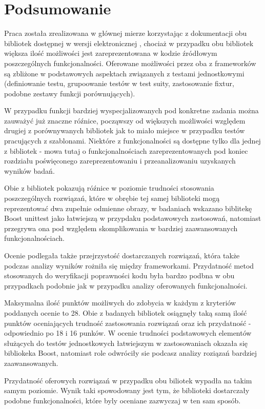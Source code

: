 \documentclass[12pt,a4paper,notitlepage]{report}
\begin{document}
\chapter{Podsumowanie}
	Praca została zrealizowana w głównej mierze korzystając z dokumentacji obu bibliotek dostępnej w wersji elektronicznej \cite{Primer}\cite{Advanced}\cite{Boost}, chociaż w przypadku obu bibliotek większa ilość możliwości jest zareprezentowana w kodzie źródłowym poszczególnych funkcjonalności. Oferowane możliwości przez oba z frameworków są zbliżone w podstawowych aspektach związanych z testami jednostkowymi (definiowanie testu, grupoowanie testów w test suity, zastosowanie fixtur, podobne zestawy funkcji porównujących).

	W przypadku funkcji bardziej wyspecjalizowanych pod konkretne zadania można zauważyć już znaczne róźnice, począwszy od większych możliwości względem drugiej z porównywanych bibliotek jak to miało miejsce w przypadku testów pracujących z szablonami. Niektóre z funkcjonalności są dostępne tylko dla jednej z bibliotek - mowa tutaj o funkcjonalnościach zareprezentowanych pod koniec rozdziału poświęconego zareprezentowaniu i przeanalizowaniu uzyskanych wyników badań.

	Obie z bibliotek pokazują róźnice w poziomie trudności stosowania poszczególnych rozwiązań, które w obrębie tej samej biblioteki mogą reprezentować dwa zupełnie odmienne obrazy, w badaniach wskazano biblitekę Boost unittest jako łatwiejszą w przypdaku podstawowych zastosowań, natomiast przegrywa ona pod względem skomplikowania w bardziej zaawansowanych funkcjonalnościach.

	Ocenie podlegała także przejrzystość dostarczanych rozwiązań, która także podczas analizy wyników rożniła się między frameworkami. Przydatność metod stosowanych do weryfikacji poprawności kodu była bardzo podbna w obu przypadkach podobnie jak w przypadku analizy oferowanych funkcjonalności.

	Maksymalna ilość punktów możliwych do zdobycia w każdym z kryteriów poddanych ocenie to 28. Obie z badanych bibliotek osiągnęły taką samą ilość punktów oceniających trudność zastosowania rozwiązań oraz ich przydatność - odpowiednio po 18 i 16 punków. W ocenie trudności podstawowych elementów służących do testów jednostkowych łatwiejszym w zastosowaniach okazała się bibliokeka Boost, natomiast role odwróciły sie podcasz analizy roziązań bardziej zaawansowanych.

	Przydatność oferowych rozwiązań w przypadku obu biliotek wypadła na takim samym poziomie. Wynik taki spowodowany jest tym, że biblioteki dostarczały podobne funkcjonalności, które byly oceniane zazwyczaj w ten sam sposób.
\end{document}
